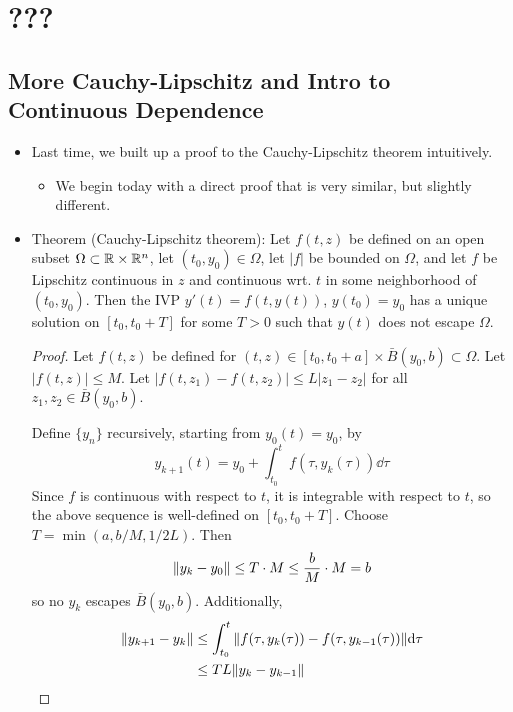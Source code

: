 \documentclass[../notes.tex]{subfiles}
\begin{document}
\chapter{???}
\section{More Cauchy-Lipschitz and Intro to Continuous Dependence}
\begin{itemize}
    \item {}Last time, we built up a proof to the Cauchy-Lipschitz theorem intuitively.
    \begin{itemize}
        \item We begin today with a direct proof that is very similar, but slightly different.
    \end{itemize}
    \item Theorem (Cauchy-Lipschitz theorem): Let $f(t,z)$ be defined on an open subset $\Omega\subset\mathbb{R}\times\mathbb{R}^n$, let $(t_0,y_0)\in\Omega$, let $|f|$ be bounded on $\Omega$, and let $f$ be Lipschitz continuous in $z$ and continuous wrt. $t$ in some neighborhood of $(t_0,y_0)$. Then the IVP $y'(t)=f(t,y(t))$, $y(t_0)=y_0$ has a unique solution on $[t_0,t_0+T]$ for some $T>0$ such that $y(t)$ does not escape $\Omega$.
    \begin{proof}
        Let $f(t,z)$ be defined for $(t,z)\in[t_0,t_0+a]\times\bar{B}(y_0,b)\subset\Omega$. Let $|f(t,z)|\leq M$. Let $|f(t,z_1)-f(t,z_2)|\leq L|z_1-z_2|$ for all $z_1,z_2\in\bar{B}(y_0,b)$.\par
        Define $\{y_n\}$ recursively, starting from $y_0(t)=y_0$, by
        \begin{equation*}
            y_{k+1}(t) = y_0+\int_{t_0}^tf(\tau,y_k(\tau))\dd\tau
        \end{equation*}
        Since $f$ is continuous with respect to $t$, it is integrable with respect to $t$, so the above sequence is well-defined on $[t_0,t_0+T]$. Choose $T=\min(a,b/M,1/2L)$. Then
        \begin{equation*}
            \norm{y_k-y_0} \leq T\cdot M
            \leq \frac{b}{M}\cdot M
            = b
        \end{equation*}
        so no $y_k$ escapes $\bar{B}(y_0,b)$. Additionally,
        \begin{align*}
            \norm{y_{k+1}-y_k} &\leq \int_{t_0}^t\norm{f(\tau,y_k(\tau))-f(\tau,y_{k-1}(\tau))}\dd\tau\\
            &\leq TL\norm{y_k-y_{k-1}}\\

\end{align*}
\end{proof}
\end{itemize}
\end{document}
